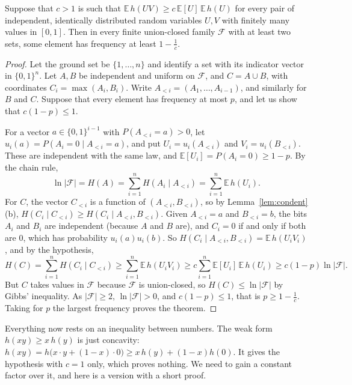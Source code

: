 \begin{theorem}\label{thm:gilmer}
Suppose that $c>1$ is such that $\mathbb E\,h(UV)\ge c\,\mathbb E[U]\,\mathbb E\,h(U)$ for every pair of independent, identically distributed random
variables $U,V$ with finitely many values in $[0,1]$. Then in every finite union-closed family $\mathcal F$ with at least two sets, some element has
frequency at least $1-\frac1c$.
\end{theorem}
\begin{proof}
Let the ground set be $\{1,\dots,n\}$ and identify a set with its indicator vector in $\{0,1\}^n$. Let $A,B$ be independent and uniform on $\mathcal F$,
and $C=A\cup B$, with coordinates $C_i=\max(A_i,B_i)$. Write $A_{<i}=(A_1,\dots,A_{i-1})$, and similarly for $B$ and $C$. Suppose that every element has
frequency at most $p$, and let us show that $c(1-p)\le1$.

For a vector $a\in\{0,1\}^{i-1}$ with $P(A_{<i}=a)>0$, let $u_i(a)=P(A_i=0\mid A_{<i}=a)$, and put $U_i=u_i(A_{<i})$ and $V_i=u_i(B_{<i})$. These are
independent with the same law, and $\mathbb E[U_i]=P(A_i=0)\ge1-p$. By the chain rule,
\[
\ln|\mathcal F|=H(A)=\sum_{i=1}^nH(A_i\mid A_{<i})=\sum_{i=1}^n\mathbb E\,h(U_i).
\]
For $C$, the vector $C_{<i}$ is a function of $(A_{<i},B_{<i})$, so by Lemma~\ref{lem:condent}(b),
$H(C_i\mid C_{<i})\ge H(C_i\mid A_{<i},B_{<i})$. Given $A_{<i}=a$ and $B_{<i}=b$, the bits $A_i$ and $B_i$ are independent (because $A$ and $B$ are), and
$C_i=0$ if and only if both are $0$, which has probability $u_i(a)u_i(b)$. So $H(C_i\mid A_{<i},B_{<i})=\mathbb E\,h(U_iV_i)$, and by the hypothesis,
\[
H(C)=\sum_{i=1}^nH(C_i\mid C_{<i})\ge\sum_{i=1}^n\mathbb E\,h(U_iV_i)\ge c\sum_{i=1}^n\mathbb E[U_i]\,\mathbb E\,h(U_i)\ge c(1-p)\ln|\mathcal F|.
\]
But $C$ takes values in $\mathcal F$ because $\mathcal F$ is union-closed, so $H(C)\le\ln|\mathcal F|$ by Gibbs' inequality. As $|\mathcal F|\ge2$,
$\ln|\mathcal F|>0$, and $c(1-p)\le1$, that is $p\ge1-\frac1c$. Taking for $p$ the largest frequency proves the theorem.
\end{proof}

Everything now rests on an inequality between numbers. The weak form $h(xy)\ge x\,h(y)$ is just concavity: $h(xy)=h\bigl(x\cdot y+(1-x)\cdot0\bigr)\ge
x\,h(y)+(1-x)h(0)$. It gives the hypothesis with $c=1$ only, which proves nothing. We need to gain a constant factor over it, and here is a version with a
short proof.

